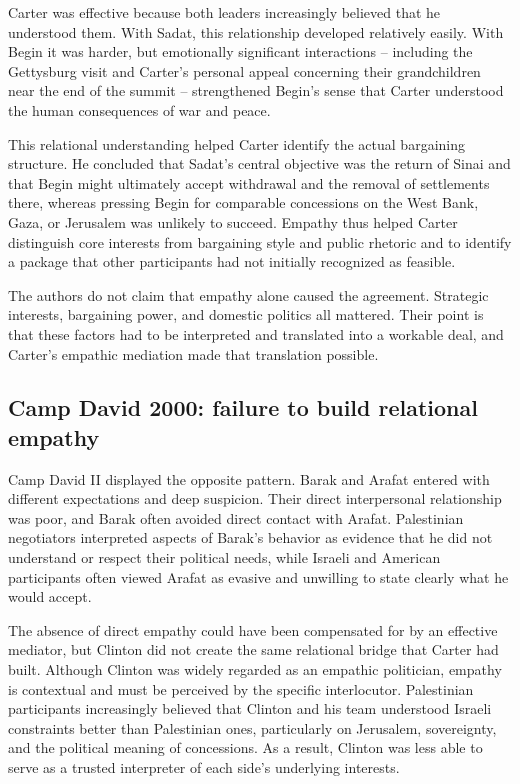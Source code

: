 Carter was effective because both leaders increasingly believed that he understood them. With Sadat, this relationship developed relatively easily. With Begin it was harder, but emotionally significant interactions -- including the Gettysburg visit and Carter's personal appeal concerning their grandchildren near the end of the summit -- strengthened Begin's sense that Carter understood the human consequences of war and peace.

This relational understanding helped Carter identify the actual bargaining structure. He concluded that Sadat's central objective was the return of Sinai and that Begin might ultimately accept withdrawal and the removal of settlements there, whereas pressing Begin for comparable concessions on the West Bank, Gaza, or Jerusalem was unlikely to succeed. Empathy thus helped Carter distinguish core interests from bargaining style and public rhetoric and to identify a package that other participants had not initially recognized as feasible.

The authors do not claim that empathy alone caused the agreement. Strategic interests, bargaining power, and domestic politics all mattered. Their point is that these factors had to be interpreted and translated into a workable deal, and Carter's empathic mediation made that translation possible.

\subsection{Camp David 2000: failure to build relational empathy}

Camp David II displayed the opposite pattern. Barak and Arafat entered with different expectations and deep suspicion. Their direct interpersonal relationship was poor, and Barak often avoided direct contact with Arafat. Palestinian negotiators interpreted aspects of Barak's behavior as evidence that he did not understand or respect their political needs, while Israeli and American participants often viewed Arafat as evasive and unwilling to state clearly what he would accept.

The absence of direct empathy could have been compensated for by an effective mediator, but Clinton did not create the same relational bridge that Carter had built. Although Clinton was widely regarded as an empathic politician, empathy is contextual and must be perceived by the specific interlocutor. Palestinian participants increasingly believed that Clinton and his team understood Israeli constraints better than Palestinian ones, particularly on Jerusalem, sovereignty, and the political meaning of concessions. As a result, Clinton was less able to serve as a trusted interpreter of each side's underlying interests.

